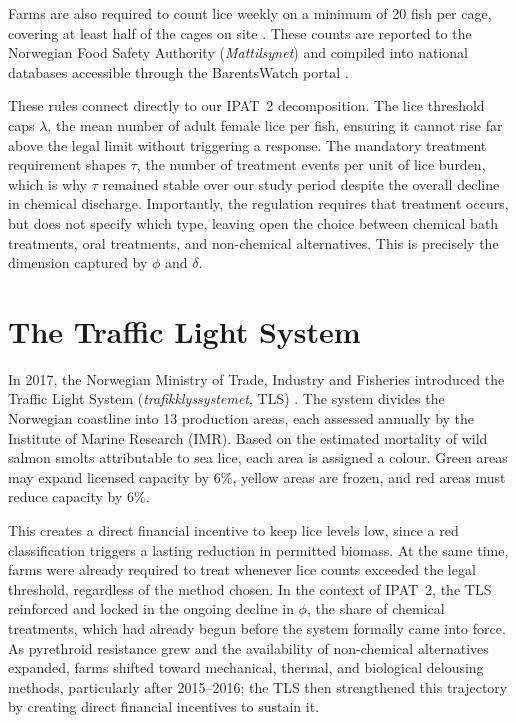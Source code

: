 \documentclass[12pt, a4paper]{report}
\begin{document}
Farms are also required to count lice weekly on a minimum of 20 fish per cage, covering at least half of the cages on site \citep{plos2018}. These counts are reported to the Norwegian Food Safety Authority (\textit{Mattilsynet}) and compiled into national databases accessible through the BarentsWatch portal \citep{barentswatch}.

These rules connect directly to our IPAT~2 decomposition. The lice threshold caps $\lambda$, the mean number of adult female lice per fish, ensuring it cannot rise far above the legal limit without triggering a response. The mandatory treatment requirement shapes $\tau$, the number of treatment events per unit of lice burden, which is why $\tau$ remained stable over our study period despite the overall decline in chemical discharge. Importantly, the regulation requires that treatment occurs, but does not specify which type, leaving open the choice between chemical bath treatments, oral treatments, and non-chemical alternatives. This is precisely the dimension captured by $\phi$ and $\delta$.

\section{The Traffic Light System}

In 2017, the Norwegian Ministry of Trade, Industry and Fisheries introduced the Traffic Light System (\textit{trafikklyssystemet}, TLS) \citep{nes2025, seafoodsource2024}. The system divides the Norwegian coastline into 13 production areas, each assessed annually by the Institute of Marine Research (IMR). Based on the estimated mortality of wild salmon smolts attributable to sea lice, each area is assigned a colour. Green areas may expand licensed capacity by 6\%, yellow areas are frozen, and red areas must reduce capacity by 6\%.

This creates a direct financial incentive to keep lice levels low, since a red classification triggers a lasting reduction in permitted biomass. At the same time, farms were already required to treat whenever lice counts exceeded the legal threshold, regardless of the method chosen. In the context of IPAT~2, the TLS reinforced and locked in the ongoing decline in $\phi$, the share of chemical treatments, which had already begun before the system formally came into force. As pyrethroid resistance grew \citep{sciencedirect2020b} and the availability of non-chemical alternatives expanded, farms shifted toward mechanical, thermal, and biological delousing methods, particularly after 2015--2016; the TLS then strengthened this trajectory by creating direct financial incentives to sustain it.
\end{document}
